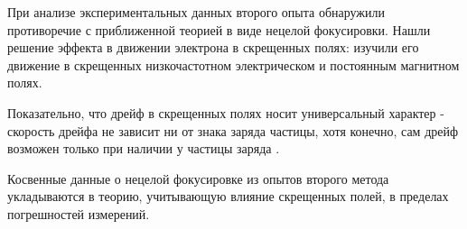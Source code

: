 При анализе экспериментальных данных второго опыта обнаружили противоречие с приближенной теорией в виде нецелой фокусировки. Нашли решение эффекта в движении электрона в скрещенных полях: изучили его движение в скрещенных низкочастотном электрическом и постоянным магнитном полях. 

Показательно, что дрейф в скрещенных полях носит универсальный характер - скорость дрейфа не зависит ни от знака заряда частицы, хотя конечно, сам дрейф возможен только при наличии у частицы заряда \cite{radantscev}.

Косвенные данные о нецелой фокусировке из опытов второго метода укладываются в теорию, учитывающую влияние скрещенных полей, в пределах погрешностей измерений.

\newpage


